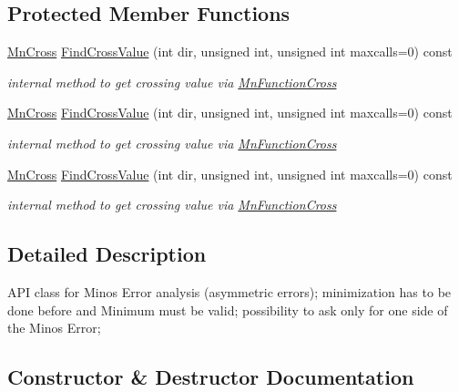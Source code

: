\subsection*{Protected Member Functions}
\begin{DoxyCompactItemize}
\item 
\mbox{\hyperlink{classROOT_1_1Minuit2_1_1MnCross}{Mn\+Cross}} \mbox{\hyperlink{classROOT_1_1Minuit2_1_1MnMinos_a4b8df109769bd0bee2127da68615bb11}{Find\+Cross\+Value}} (int dir, unsigned int, unsigned int maxcalls=0) const
\begin{DoxyCompactList}\small\item\em internal method to get crossing value via \mbox{\hyperlink{classROOT_1_1Minuit2_1_1MnFunctionCross}{Mn\+Function\+Cross}} \end{DoxyCompactList}\item 
\mbox{\hyperlink{classROOT_1_1Minuit2_1_1MnCross}{Mn\+Cross}} \mbox{\hyperlink{classROOT_1_1Minuit2_1_1MnMinos_a4b8df109769bd0bee2127da68615bb11}{Find\+Cross\+Value}} (int dir, unsigned int, unsigned int maxcalls=0) const
\begin{DoxyCompactList}\small\item\em internal method to get crossing value via \mbox{\hyperlink{classROOT_1_1Minuit2_1_1MnFunctionCross}{Mn\+Function\+Cross}} \end{DoxyCompactList}\item 
\mbox{\hyperlink{classROOT_1_1Minuit2_1_1MnCross}{Mn\+Cross}} \mbox{\hyperlink{classROOT_1_1Minuit2_1_1MnMinos_a4b8df109769bd0bee2127da68615bb11}{Find\+Cross\+Value}} (int dir, unsigned int, unsigned int maxcalls=0) const
\begin{DoxyCompactList}\small\item\em internal method to get crossing value via \mbox{\hyperlink{classROOT_1_1Minuit2_1_1MnFunctionCross}{Mn\+Function\+Cross}} \end{DoxyCompactList}\end{DoxyCompactItemize}


\subsection{Detailed Description}
A\+PI class for Minos Error analysis (asymmetric errors); minimization has to be done before and Minimum must be valid; possibility to ask only for one side of the Minos Error; 

\subsection{Constructor \& Destructor Documentation}
\mbox{\label{classROOT_1_1Minuit2_1_1MnMinos_ac64ec75423efa6e473ee722f08f47eb4}} 
